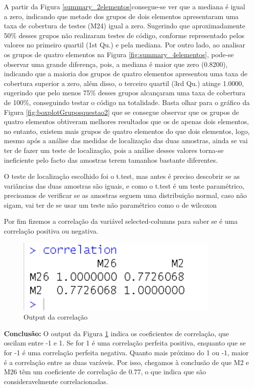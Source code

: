 A partir da Figura \ref{summary_2elementos}consegue-se ver que a mediana é igual a zero, indicando que metade dos grupos de dois elementos apresentaram uma taxa de cobertura de testes (M24) igual a zero. Sugerindo que aproximadamente 50\% desses grupos não realizaram testes de código, conforme representado pelos valores no primeiro quartil (1st Qu.) e pela mediana. 
Por outro lado, ao analisar os grupos de quatro elementos na Figura \ref{fig:summary_4elementos}, pode-se observar uma grande diferença, pois,  a mediana é maior que zero (0.8200), indicando que a maioria dos grupos de quatro elementos apresentou uma taxa de cobertura superior a zero, além disso, o terceiro quartil (3rd Qu.) atinge 1.0000, sugerindo que pelo menos 75\% desses grupos alcançaram uma taxa de cobertura de 100\%, conseguindo testar o código na totalidade.
Basta olhar para o gráfico da Figura \ref{fig:boxplotGruposquestao2} que se consegue observar que os grupos de quatro elementos obtiveram melhores resultados que os de apenas dois elementos, no entanto, existem mais grupos de quatro elementos do que dois elementos, logo, mesmo após a análise das medidas de localização das duas amostras, ainda se vai ter de fazer um teste de localização, pois a análise desses valores torna-se ineficiente pelo facto das amostras terem tamanhos bastante diferentes.

O teste de localização escolhido foi o t.test, mas antes é preciso descobrir se as variâncias das duas amostras são iguais, e como o t.test é um teste paramétrico, precisamos de verificar se as amostras seguem uma distribuição normal, caso não sigam, vai ter de se usar um teste não paramétrico como o de wilcoxon


\newpage
Por fim fizemos a correlação da variável selected-columns para saber se é uma correlação positiva ou negativa.



\begin{figure}[!h]
    \centering
    \includegraphics[width=10cm]{imagens/Resultado_Correlacao_Questao2.png}
    \caption{Output da correlação}
    \label{outputCorrelacaoQ2}
\end{figure}

\vspace{0.2cm}

\textbf{Conclusão:} O output da Figura \ref{outputCorrelacaoQ2} indica os coeficientes de correlação, que oscilam entre -1 e 1. Se for 1 é uma correlação perfeita positiva, enquanto que se for -1 é uma correlação perfeita negativa. Quanto mais próximo do 1 ou -1, maior é a correlação entre as duas varáveis. Por isso, chegamos à conclusão de que M2 e M26 têm um coeficiente de correlação de 0.77, o que indica que são consideravelmente correlacionadas.